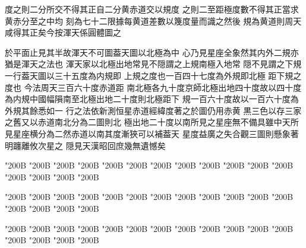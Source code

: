 \begin{正文}
度之則二分所交不得其正自二分黄赤道交以規度
之則二至距極度數不得其正當求黄赤分至之中均
刻為七十二限據每黄道差數以篾度量而識之然後
規為黄道則周天咸得其正矣今按渾天係圓體圖之
\par
於平面止見其半故渾天不可圖葢天圖以北極為中
心乃見星座全象然其内外二規亦猶是渾天之法也
渾天家以北極出地常見不隠謂之上規南極入地常
隠不見謂之下規一行葢天圖以三十五度為内規即
上規之度也一百四十七度為外規即北極
距下規之度也
今法周天三百六十度赤道距
南北極各九十度京師北極出地四十度故以四十度
為内規中國幅隕南至北極出地二十度則北極距下
規一百六十度故以一百六十度為外規其餘悉如一
行之法依新測恒星赤道經緯度著之於圖仍用赤黄
黒三色以存三家之舊又以赤道南北分為二圖則北
極出地二十度以南所見之星座無不備具雖中天所
見星座横分為二然赤道以南其度漸狹可以補葢天
星度益廣之失合觀三圖則懸象著明躔離攸次星之
隠見天漢昭回庶幾無遺憾矣
\par
\end{正文}\clearpage
{}
\begin{正文}
\char"200B\relax{}
\char"200B\relax{}
\char"200B\relax{}
\char"200B\relax{}
\char"200B\relax{}
\char"200B\relax{}
\char"200B\relax{}
\char"200B\relax{}
\char"200B\relax{}
\char"200B\relax{}
\char"200B\relax{}
\char"200B\relax{}
\char"200B\relax{}
\char"200B\relax{}
\char"200B\relax{}
\char"200B\relax
{}\par
\end{正文}\clearpage
{}
\begin{正文}
\char"200B\relax{}
\char"200B\relax{}
\char"200B\relax{}
\char"200B\relax{}
\char"200B\relax{}
\char"200B\relax{}
\char"200B\relax{}
\char"200B\relax{}
\char"200B\relax{}
\char"200B\relax{}
\char"200B\relax{}
\char"200B\relax{}
\char"200B\relax{}
\char"200B\relax{}
\char"200B\relax{}
\char"200B\relax
{}\par
\end{正文}\clearpage
{}
\begin{正文}
\char"200B\relax{}
\char"200B\relax{}
\char"200B\relax{}
\char"200B\relax{}
\char"200B\relax{}
\char"200B\relax{}
\char"200B\relax{}
\char"200B\relax{}
\char"200B\relax{}
\char"200B\relax{}
\char"200B\relax{}
\char"200B\relax{}
\char"200B\relax{}
\char"200B\relax{}
\char"200B\relax{}
\char"200B\relax
{}\par

\par\end{正文}\clearpage
